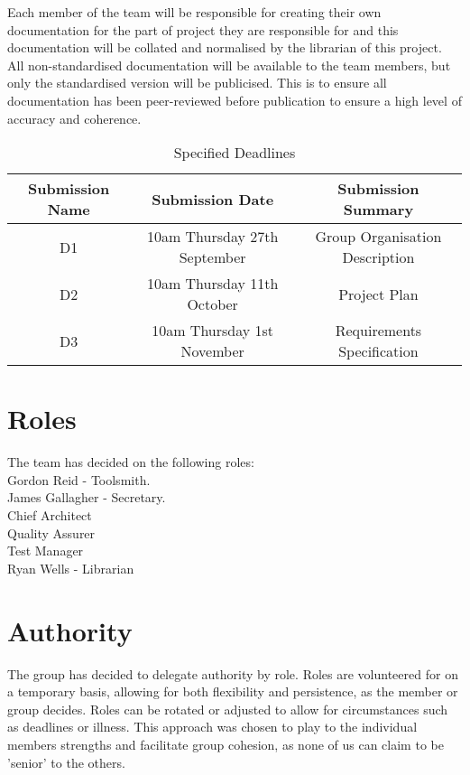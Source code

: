 \documentclass{l3deliverable}
\begin{document}
Each member of the team will be responsible for creating 
their own documentation for the part of project they are responsible for and 
this documentation will be collated and normalised by the librarian of this 
project. All non-standardised documentation will be available to the team 
members, but only the standardised version will be publicised. This is to 
ensure all documentation has been peer-reviewed before publication to ensure
a high level of accuracy and coherence. 

\begin{table}[H]
\begin{tabular}{|c|c|c|}
  \hline
  Submission Name & Submission Date & Submission Summary \\
  \hline
  D1 & 10am Thursday 27th September & Group Organisation Description\\
  D2 & 10am Thursday 11th October & Project Plan\\
  D3 & 10am Thursday 1st November & Requirements Specification\\
  \hline
\end{tabular}
\caption{Specified Deadlines}
\label{tab:DeadlineTable}
\end{table}

\pagebreak

\section{Roles}

The team has decided on the following roles:\\
Gordon Reid - Toolsmith. \\
James Gallagher - Secretary. \\
Chief Architect \\
Quality Assurer \\
Test Manager \\
Ryan Wells - Librarian

\section{Authority}

The group has decided to delegate authority by role. Roles are
volunteered for on a temporary basis, allowing for both flexibility
and persistence, as the member or group decides. Roles can be rotated
or adjusted to allow for circumstances such as deadlines or
illness. This approach was chosen to play to the individual members
strengths and facilitate group cohesion, as none of us can claim to be
'senior' to the others.
\end{document}
